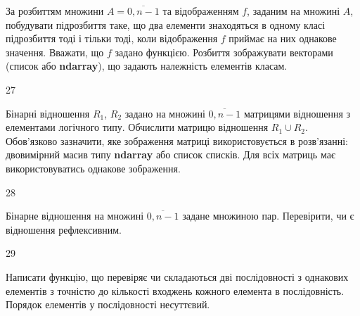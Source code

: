 За розбиттям множини $A=\overline{0,n-1}$ та відображенням $f$, заданим на множині $A$, побудувати підрозбиття таке, що два елементи знаходяться в одному класі підрозбиття тоді і тільки тоді, коли відображення $f$ приймає на них однакове значення. Вважати, що $f$ задано функцією. Розбиття зображувати векторами (список або  \textbf{ndarray}), що задають належність елементів класам.
\\\par
27 














Бінарні відношення $R_1$, $R_2$ задано на множині $\overline{0,n-1}$ матрицями відношення з елементами логічного типу. Обчислити матрицю відношення $R_1\cup R_2$. Обов'язково зазначити, яке зображення матриці використовується в розв'язанні: двовимірний масив типу \textbf{ndarray} або список списків. Для всіх матриць має використовуватись однакове зображення.
\\\par
28 














Бінарне відношення на множині $\overline{0,n-1}$ задане множиною пар. Перевірити, чи є відношення рефлексивним.
\\\par
29 














Написати функцію, що перевіряє чи складаються дві послідовності з однакових елементів з точністю до кількості входжень кожного елемента в послідовність. Порядок елементів у послідовності несуттєвий.
\\\par
{} 














